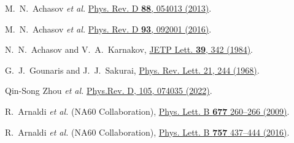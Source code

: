 \documentclass[twocolumn,aps,prd,floatfix,nofootinbib,superscriptaddress]{revtex4-2}
\begin{document}
\begin{thebibliography}{9}
M.~N.~Achasov \emph{et al.}
\href{https://doi.org/10.1103/PhysRevD.88.054013}
{Phys. Rev. D \textbf{88}, 054013 (2013)}.

M.~N.~Achasov \emph{et al.}
\href{https://doi.org/10.1103/PhysRevD.93.092001}{Phys. Rev. D \textbf{93}, 092001 (2016)}.

N.~N.~Achasov and V.~A.~Karnakov,
\href{http://jetpletters.ru/ps/1289/article_19485.shtml}
{JETP Lett. \textbf{39}, 342 (1984)}.

G.~J.~Gounaris and J.~J.~Sakurai,
\href{https://doi.org/10.1103/PhysRevLett.21.244}
{Phys. Rev. Lett. 21, 244 (1968)}.

Qin-Song Zhou \emph{et al.}
\href{https://doi.org/10.1103/PhysRevD.105.074035}{Phys.Rev. D, 105, 074035 (2022)}.

R.~Arnaldi \emph{et al.} (NA60 Collaboration),
\href{https://doi.org/10.1016/j.physletb.2009.05.029}
{Phys. Lett. B \textbf{677} 260–266 (2009)}.

R.~Arnaldi \emph{et al.} (NA60 Collaboration),
\href{https://doi.org/10.1016/j.physletb.2016.04.013}
{Phys. Lett. B \textbf{757} 437–444 (2016)}.

\end{thebibliography}
\end{document}
